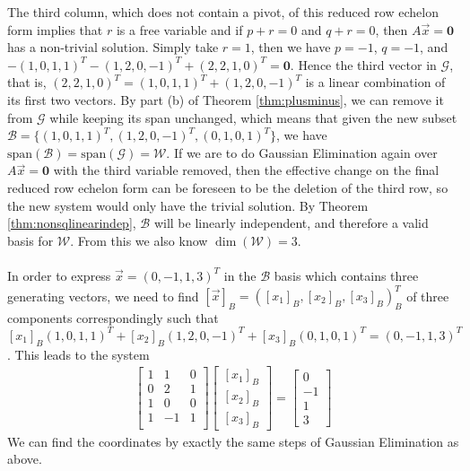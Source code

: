 \begin{solution}
The third column, which does not contain a pivot, of this reduced row echelon form implies that $r$ is a free variable and if $p + r = 0$ and $q + r = 0$, then $A\vec{x} = \textbf{0}$ has a non-trivial solution. Simply take $r = 1$, then we have $p = -1$, $q = -1$, and $-(1,0,1,1)^T - (1,2,0,-1)^T + (2,2,1,0)^T = \textbf{0}$. Hence the third vector in $\mathcal{G}$, that is, $(2,2,1,0)^T = (1,0,1,1)^T + (1,2,0,-1)^T$ is a linear combination of its first two vectors. By part (b) of Theorem \ref{thm:plusminus}, we can remove it from $\mathcal{G}$ while keeping its span unchanged, which means that given the new subset $\mathcal{B} = \{(1,0,1,1)^T, (1,2,0,-1)^T, (0,1,0,1)^T\}$, we have $\text{span}(\mathcal{B}) = \text{span}(\mathcal{G}) = \mathcal{W}$. If we are to do Gaussian Elimination again over $A\vec{x} = \textbf{0}$ with the third variable removed, then the effective change on the final reduced row echelon form can be foreseen to be the deletion of the third row, so the new system would only have the trivial solution. By Theorem \ref{thm:nonsqlinearindep}, $\mathcal{B}$ will be linearly independent, and therefore a valid basis for $\mathcal{W}$. From this we also know $\dim(\mathcal{W}) = 3$.\\
\\
In order to express $\vec{x} = (0,-1,1,3)^T$ in the $\mathcal{B}$ basis which contains three generating vectors, we need to find $[\vec{x}]_B = ([x_1]_B, [x_2]_B, [x_3]_B)_B^T$ of three components correspondingly such that $[x_1]_B(1,0,1,1)^T + [x_2]_B(1,2,0,-1)^T + [x_3]_B(0,1,0,1)^T = (0,-1,1,3)^T$. This leads to the system
\begin{align*}
\begin{bmatrix}
1 & 1 & 0\\
0 & 2 & 1 \\
1 & 0 & 0 \\
1 & -1 & 1\\
\end{bmatrix}
\begin{bmatrix}
[x_1]_B \\
[x_2]_B \\
[x_3]_B
\end{bmatrix}
=
\begin{bmatrix}
0 \\
-1 \\
1 \\
3
\end{bmatrix}
\end{align*}
We can find the coordinates by exactly the same steps of Gaussian Elimination as above.

\end{solution}
